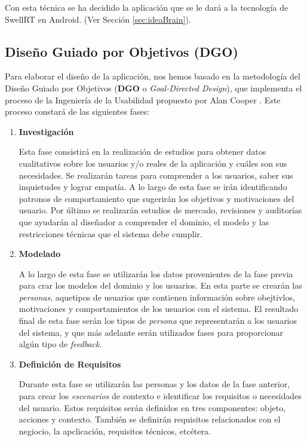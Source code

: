   Con esta técnica se ha decidido la aplicación que se le dará a la tecnología de SwellRT en Android. (Ver Sección \ref{sec:ideaBrain}).
   
  \subsection{Diseño Guiado por Objetivos (DGO)}\label{ssec:dgoDesign}
  
  Para elaborar el diseño de la aplicación, nos hemos basado en la metodología del Diseño Guiado por Objetivos (\textbf{DGO} o \textit{Goal-Directed Design}), que implementa el proceso de la Ingeniería de la Usabilidad propuesto por Alan Cooper \cite{ref:bookAlanCooper}. Este proceso constará de las siguientes fases:

\begin{enumerate}

\item \textbf{Investigación}

Esta fase consistirá en la realización de estudios para obtener datos cualitativos sobre los usuarios y/o reales de la aplicación y cuáles son sus necesidades. Se realizarán tareas para comprender a los usuarios, saber sus inquietudes y lograr empatía. A lo largo de esta fase se irán identificando patronos de comportamiento que sugerirán los objetivos y motivaciones del usuario. Por último se realizarán estudios de mercado, revisiones y auditorías que ayudarán al diseñador a comprender el dominio, el modelo y las restricciones técnicas que el sistema debe cumplir.

\item \textbf{Modelado}

A lo largo de esta fase se utilizarán los datos provenientes de la fase previa para crar los modelos del dominio y los usuarios. En esta parte se crearán las \textit{personas}, aquetipos de usuarios que contienen información sobre obejtivlos, motivaciones y comportamientos de los usuarios con el sistema. El resultado final de esta fase serán los tipos de \textit{persona} que representarán a los usuarios del sistema, y que más adelante serán utilizados fases para proporcionar algún tipo de \textit{feedback}.

\item \textbf{Definición de Requisitos}

Durante esta fase se utilizarán las personas y los datos de la fase anterior, para crear los \textit{escenarios} de contexto e identificar los requisitos o necesidades del usuario. Estos requisitos serán definidos en tres componentes: objeto, acciones y contexto. También se definirán requisitos relacionados con el negiocio, la apclicación, requisitos técnicos, etcétera.


\end{enumerate}
